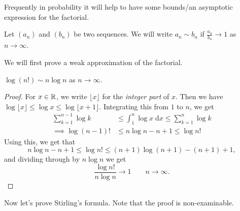 \documentclass[a4paper]{scrreprt}
\begin{document}
Frequently in probability it will help to have some bounds/an asymptotic expression for the factorial.

\begin{notation}
Let $(a_n)$ and $(b_n)$ be two sequences. We will write $a_n \sim b_n$ if $\frac{a_n}{b_n} \rightarrow 1$ as $n \rightarrow \infty$.
\end{notation}

We will first prove a weak approximation of the factorial.

\begin{proposition}
	$\log(n!) \sim n \log n$ as $n \rightarrow \infty$.
\end{proposition}
\begin{proof}
	For $x \in \mathbb{R}$, we write $\lfloor x \rfloor$ for the \emph{integer part} of $x$. Then we have $\log\lfloor x \rfloor \leq \log x \leq \log \lfloor x + 1 \rfloor$. Integrating this from $1$ to $n$, we get
	\begin{align*}
		\sum_{k = 1}^{n - 1} \log k &\leq \int_1^n \log x \; \mathrm{d} x \leq \sum_{k = 1}^n \log k\\
\implies \log (n - 1)! &\leq n \log n - n + 1 \leq \log n!
	\end{align*}
	Using this, we get that
	$$
	n \log n - n + 1 \leq \log n! \leq (n + 1) \log (n + 1) - (n + 1) + 1,
	$$
	and dividing through by $n \log n$ we get
	$$
	\frac{\log n!}{n \log n} \rightarrow 1 \quad \quad n \rightarrow \infty.
	$$
\end{proof}

Now let's prove Stirling's formula. Note that the proof is non-examinable.
\end{document}
